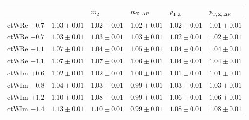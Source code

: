 \documentclass[bachelor,oneside, BCOR10mm,
			ngerman,english  %
]{GAUBM}
\begin{document}
\begin{table}
\begin{tabular}{R{23mm}|rrrrr}
	& 
	 & 
	 & 
	 & 
	 & 
	\\
		\hline
		ctWRe $+0.7$ 	& $1.03\pm0.01$ & $1.02\pm0.01$ & $1.02\pm0.01$ & $1.02\pm0.01$ & $1.01\pm0.01$ \\
		ctWRe $-0.7$ 	& $1.03\pm0.01$ & $1.03\pm0.01$ & $1.03\pm0.01$ & $1.02\pm0.01$ & $1.02\pm0.01$ \\
		ctWRe $+1.1$ 	& $1.07\pm0.01$ & $1.04\pm0.01$ & $1.05\pm0.01$ & $1.04\pm0.01$ & $1.04\pm0.01$ \\
		ctWRe $-1.1$ 	& $1.07\pm0.01$ & $1.07\pm0.01$ & $1.06\pm0.01$ & $1.04\pm0.01$ & $1.04\pm0.01$ \\
		\hline
		ctWIm $+0.6$ 	& $1.02\pm0.01$ & $1.02\pm0.01$ & $1.00\pm0.01$ & $1.01\pm0.01$ & $1.01\pm0.01$ \\
		ctWIm $-0.8$ 	& $1.04\pm0.01$ & $1.03\pm0.01$ & $0.99\pm0.01$ & $1.03\pm0.01$ & $1.03\pm0.01$ \\
		ctWIm $+1.2$ 	& $1.10\pm0.01$ & $1.08\pm0.01$ & $0.99\pm0.01$ & $1.06\pm0.01$ & $1.06\pm0.01$ \\
		ctWIm $-1.4$ 	& $1.13\pm0.01$ & $1.10\pm0.01$ & $0.99\pm0.01$ & $1.08\pm0.01$ & $1.08\pm0.01$ \\
	\end{tabular}
\end{table}
\end{document}
